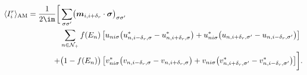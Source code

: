 \documentclass[../main.tex]{subfile}
\begin{document}
\begin{equation}
    \begin{aligned}
        \langle I_i^r\rangle_{\text{AM}} = \frac{1}{2\im}\biggl[& \sum_{\sigma\sigma'}\bigl(\bm{m}_{i,i+\delta_r}\cdot\bm{\sigma}\bigr)_{\sigma\sigma'}\\
&\sum_{n\in\mathcal{N}_+} f(E_n)                \left[u_{ni\sigma}       \bigl(u_{n,i-\delta_r,\sigma}^{\ast} - u_{n,i+\delta_r,\sigma}^{\ast}\bigr) + u_{ni\sigma}^{\ast}\bigl(u_{n,i+\delta_r,\sigma'}        - u_{n,i-\delta_r,\sigma'}       \bigr)\right]\\
                         +&\bigl(1-f(E_n)\bigr) \left[v_{ni\sigma}^{\ast}\bigl(v_{n,i-\delta_r,\sigma}        - v_{n,i+\delta_r,\sigma}       \bigr) + v_{ni\sigma}       \bigl(v_{n,i+\delta_r,\sigma'}^{\ast} - v_{n,i-\delta_r,\sigma'}^{\ast}\bigr)\right]\biggr].\\
    \end{aligned}
\end{equation}
\end{document}
